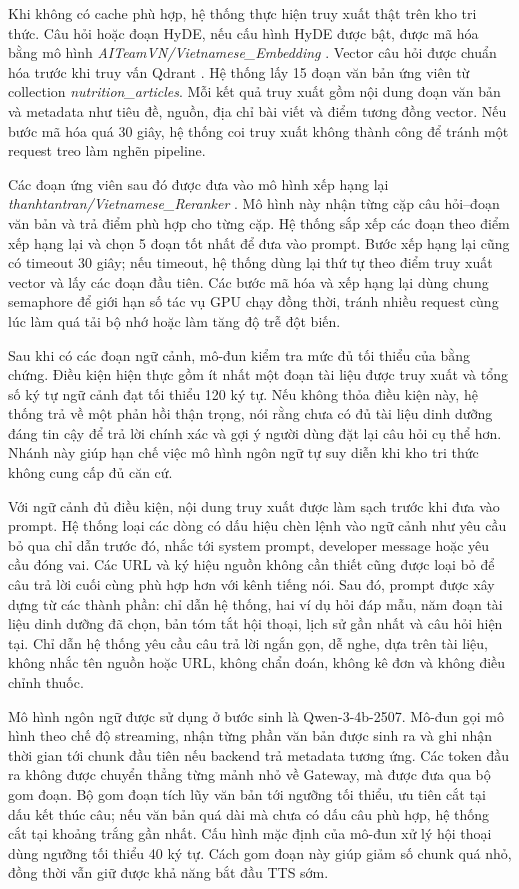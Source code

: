 \documentclass[a4paper,13pt,twoside]{report}
\begin{document}
Khi không có cache phù hợp, hệ thống thực hiện truy xuất thật trên kho tri thức. Câu hỏi hoặc đoạn HyDE, nếu cấu hình HyDE được bật, được mã hóa bằng mô hình \textit{AITeamVN/Vietnamese\_Embedding} \cite{vietembedding}. Vector câu hỏi được chuẩn hóa trước khi truy vấn Qdrant \cite{qdrant}. Hệ thống lấy 15 đoạn văn bản ứng viên từ collection \textit{nutrition\_articles}. Mỗi kết quả truy xuất gồm nội dung đoạn văn bản và metadata như tiêu đề, nguồn, địa chỉ bài viết và điểm tương đồng vector. Nếu bước mã hóa quá 30 giây, hệ thống coi truy xuất không thành công để tránh một request treo làm nghẽn pipeline.

Các đoạn ứng viên sau đó được đưa vào mô hình xếp hạng lại \textit{thanhtantran/Vietnamese\_Reranker} \cite{vietreranker}. Mô hình này nhận từng cặp câu hỏi--đoạn văn bản và trả điểm phù hợp cho từng cặp. Hệ thống sắp xếp các đoạn theo điểm xếp hạng lại và chọn 5 đoạn tốt nhất để đưa vào prompt. Bước xếp hạng lại cũng có timeout 30 giây; nếu timeout, hệ thống dùng lại thứ tự theo điểm truy xuất vector và lấy các đoạn đầu tiên. Các bước mã hóa và xếp hạng lại dùng chung semaphore để giới hạn số tác vụ GPU chạy đồng thời, tránh nhiều request cùng lúc làm quá tải bộ nhớ hoặc làm tăng độ trễ đột biến.

Sau khi có các đoạn ngữ cảnh, mô-đun kiểm tra mức đủ tối thiểu của bằng chứng. Điều kiện hiện thực gồm ít nhất một đoạn tài liệu được truy xuất và tổng số ký tự ngữ cảnh đạt tối thiểu 120 ký tự. Nếu không thỏa điều kiện này, hệ thống trả về một phản hồi thận trọng, nói rằng chưa có đủ tài liệu dinh dưỡng đáng tin cậy để trả lời chính xác và gợi ý người dùng đặt lại câu hỏi cụ thể hơn. Nhánh này giúp hạn chế việc mô hình ngôn ngữ tự suy diễn khi kho tri thức không cung cấp đủ căn cứ.

Với ngữ cảnh đủ điều kiện, nội dung truy xuất được làm sạch trước khi đưa vào prompt. Hệ thống loại các dòng có dấu hiệu chèn lệnh vào ngữ cảnh như yêu cầu bỏ qua chỉ dẫn trước đó, nhắc tới system prompt, developer message hoặc yêu cầu đóng vai. Các URL và ký hiệu nguồn không cần thiết cũng được loại bỏ để câu trả lời cuối cùng phù hợp hơn với kênh tiếng nói. Sau đó, prompt được xây dựng từ các thành phần: chỉ dẫn hệ thống, hai ví dụ hỏi đáp mẫu, năm đoạn tài liệu dinh dưỡng đã chọn, bản tóm tắt hội thoại, lịch sử gần nhất và câu hỏi hiện tại. Chỉ dẫn hệ thống yêu cầu câu trả lời ngắn gọn, dễ nghe, dựa trên tài liệu, không nhắc tên nguồn hoặc URL, không chẩn đoán, không kê đơn và không điều chỉnh thuốc.

Mô hình ngôn ngữ được sử dụng ở bước sinh là Qwen-3-4b-2507. Mô-đun gọi mô hình theo chế độ streaming, nhận từng phần văn bản được sinh ra và ghi nhận thời gian tới chunk đầu tiên nếu backend trả metadata tương ứng. Các token đầu ra không được chuyển thẳng từng mảnh nhỏ về Gateway, mà được đưa qua bộ gom đoạn. Bộ gom đoạn tích lũy văn bản tới ngưỡng tối thiểu, ưu tiên cắt tại dấu kết thúc câu; nếu văn bản quá dài mà chưa có dấu câu phù hợp, hệ thống cắt tại khoảng trắng gần nhất. Cấu hình mặc định của mô-đun xử lý hội thoại dùng ngưỡng tối thiểu 40 ký tự. Cách gom đoạn này giúp giảm số chunk quá nhỏ, đồng thời vẫn giữ được khả năng bắt đầu TTS sớm.
\end{document}
